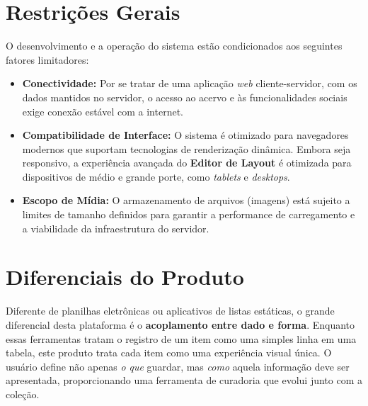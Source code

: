 \section{Restrições Gerais}

O desenvolvimento e a operação do sistema estão condicionados aos seguintes fatores limitadores:

\begin{itemize}
    \item \textbf{Conectividade:} Por se tratar de uma aplicação \textit{web} cliente-servidor, com os dados mantidos no servidor, o acesso ao acervo e às funcionalidades sociais exige conexão estável com a internet.
    \item \textbf{Compatibilidade de Interface:} O sistema é otimizado para navegadores modernos que suportam tecnologias de renderização dinâmica. Embora seja responsivo, a experiência avançada do \textbf{Editor de Layout} é otimizada para dispositivos de médio e grande porte, como \textit{tablets} e \textit{desktops}.
    \item \textbf{Escopo de Mídia:} O armazenamento de arquivos (imagens) está sujeito a limites de tamanho definidos para garantir a performance de carregamento e a viabilidade da infraestrutura do servidor.
\end{itemize}

\section{Diferenciais do Produto}

Diferente de planilhas eletrônicas ou aplicativos de listas estáticas, o grande diferencial desta plataforma é o \textbf{acoplamento entre dado e forma}. Enquanto essas ferramentas tratam o registro de um item como uma simples linha em uma tabela, este produto trata cada item como uma experiência visual única. O usuário define não apenas \textit{o que} guardar, mas \textit{como} aquela informação deve ser apresentada, proporcionando uma ferramenta de curadoria que evolui junto com a coleção.
